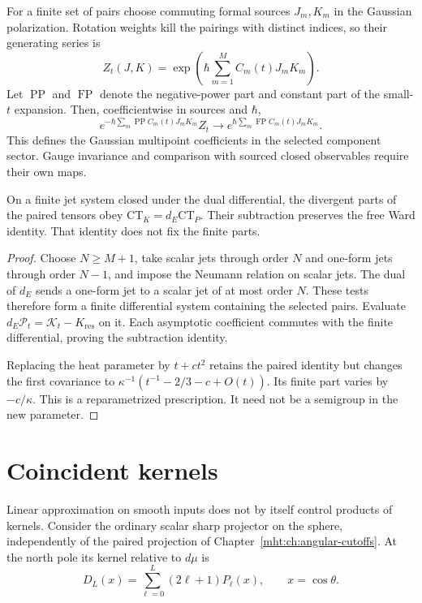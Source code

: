For a finite set of pairs choose commuting formal sources
$J_m,K_m$ in the Gaussian polarization. Rotation weights kill
the pairings with distinct indices, so their generating series is
\[
 Z_t(J,K)=\exp\left(\hbar\sum_{m=1}^M C_m(t)J_mK_m\right).
\]
Let $\operatorname{PP}$ and $\operatorname{FP}$ denote the
negative-power part and constant part of the small-$t$ expansion.
Then, coefficientwise in sources and $\hbar$,
\[
 e^{-\hbar\sum_m\operatorname{PP}C_m(t)J_mK_m}Z_t
   \longrightarrow
 e^{\hbar\sum_m\operatorname{FP}C_m(t)J_mK_m}.
\]
This defines the Gaussian multipoint coefficients in the selected
component sector. Gauge invariance and comparison with sourced
closed observables require their own maps.

\begin{proposition}\label{mht:prop:heat-jet-subtraction}
On a finite jet system closed under the dual differential,
the divergent parts of the paired tensors obey
$\mathrm{CT}_K=d_E\mathrm{CT}_P$. Their subtraction preserves
the free Ward identity. That identity does not fix the finite
parts.
\end{proposition}

\begin{proof}
Choose $N\geq M+1$, take scalar jets through order $N$ and
one-form jets through order $N-1$, and impose the Neumann
relation on scalar jets. The dual of $d_E$ sends a one-form jet to a scalar jet of at
most order $N$. These tests therefore form a finite differential
system containing the selected pairs.
Evaluate $d_E\mathcal P_t=\mathcal K_t-K_{\mathrm{res}}$ on
it. Each asymptotic coefficient commutes with the finite
differential, proving the subtraction identity.

Replacing the heat parameter by $t+ct^2$ retains the paired
identity but changes the first covariance to
$\kappa^{-1}(t^{-1}-2/3-c+O(t))$. Its finite part varies
by $-c/\kappa$. This is a reparametrized prescription. It need
not be a semigroup in the new parameter.
\end{proof}

\section{Coincident kernels}

Linear approximation on smooth inputs does not by itself
control products of kernels. Consider the ordinary scalar
sharp projector on the sphere, independently of the paired
projection of Chapter~\ref{mht:ch:angular-cutoffs}. At the
north pole its kernel relative to $d\mu$ is
\[
 D_L(x)=\sum_{\ell=0}^L(2\ell+1)P_\ell(x),\qquad x=\cos\theta.
\]

